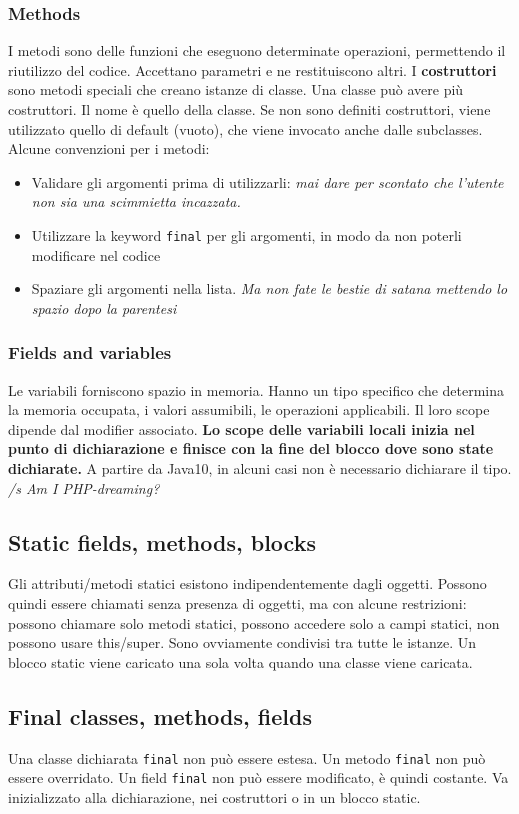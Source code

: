 \documentclass[11pt]{article}
\newcommand{\code}[1]{\texttt{#1}}
\begin{document}
\subsubsection{Methods}
I metodi sono delle funzioni che eseguono determinate operazioni, permettendo il riutilizzo del codice. Accettano parametri e ne restituiscono altri.
I \textbf{costruttori} sono metodi speciali che creano istanze di classe. Una classe può avere più costruttori. Il nome è quello della classe. Se non sono definiti costruttori, viene utilizzato quello di default (vuoto), che viene invocato anche dalle subclasses.
Alcune convenzioni per i metodi:
\begin{itemize}
    \item Validare gli argomenti prima di utilizzarli: \textit{mai dare per scontato che l'utente non sia una scimmietta incazzata.}
    \item Utilizzare la keyword \code{final} per gli argomenti, in modo da non poterli modificare nel codice
    \item Spaziare gli argomenti nella lista. \textit{Ma non fate le bestie di satana mettendo lo spazio dopo la parentesi}
\end{itemize} 
\subsubsection{Fields and variables}
Le variabili forniscono spazio in memoria. Hanno un tipo specifico che determina la memoria occupata, i valori assumibili, le operazioni applicabili. Il loro scope dipende dal modifier associato. \textbf{Lo scope delle variabili locali inizia nel punto di dichiarazione e finisce con la fine del blocco dove sono state dichiarate.} A partire da Java10, in alcuni casi non è necessario dichiarare il tipo. \textit{/s Am I PHP-dreaming?}
\subsection{Static fields, methods, blocks}
Gli attributi/metodi statici esistono indipendentemente dagli oggetti. Possono quindi essere chiamati senza presenza di oggetti, ma con alcune restrizioni: possono chiamare solo metodi statici, possono accedere solo a campi statici, non possono usare this/super. Sono ovviamente condivisi tra tutte le istanze. Un blocco static viene caricato una sola volta quando una classe viene caricata. 
\subsection{Final classes, methods, fields}
Una classe dichiarata \code{final} non può essere estesa. Un metodo \code{final} non può essere overridato. Un field \code{final} non può essere modificato, è quindi costante. Va inizializzato alla dichiarazione, nei costruttori o in un blocco static. 
\end{document}
